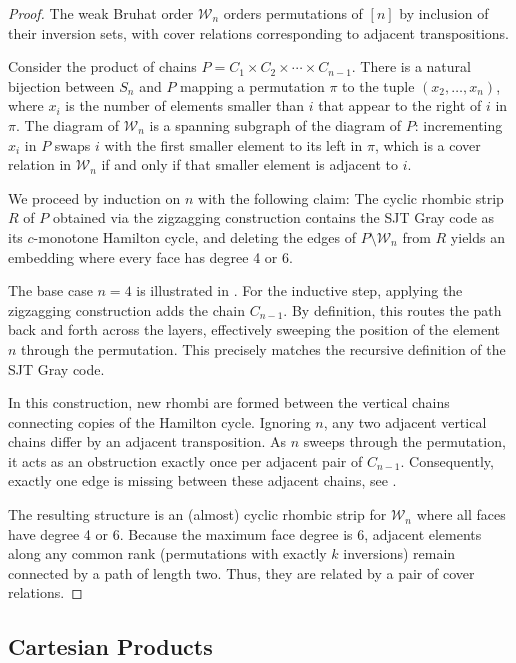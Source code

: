 \documentclass[fontsize=11pt,a4paper,DIV=12]{scrartcl}
\begin{document}
\weakBruhat*
\begin{proof}
	The weak Bruhat order $\mathcal{W}_n$ orders permutations of $[n]$ by inclusion of their inversion sets, with cover relations corresponding to adjacent transpositions.

	Consider the product of chains $P = C_1 \times C_2 \times \cdots \times C_{n-1}$. There is a natural bijection between $S_n$ and $P$ mapping a permutation $\pi$ to the tuple $(x_2, \ldots, x_n)$, where $x_i$ is the number of elements smaller than $i$ that appear to the right of $i$ in $\pi$. The diagram of $\mathcal{W}_n$ is a spanning subgraph of the diagram of $P$: incrementing $x_i$ in $P$ swaps $i$ with the first smaller element to its left in $\pi$, which is a cover relation in $\mathcal{W}_n$ if and only if that smaller element is adjacent to $i$.

	We proceed by induction on $n$ with the following claim: The cyclic rhombic strip $R$ of $P$ obtained via the zigzagging construction contains the SJT Gray code as its $c$-monotone Hamilton cycle, and deleting the edges of $P \setminus \mathcal{W}_n$ from $R$ yields an embedding where every face has degree 4 or 6.

	The base case $n=4$ is illustrated in . For the inductive step, applying the zigzagging construction adds the chain $C_{n-1}$. By definition, this routes the path back and forth across the layers, effectively sweeping the position of the element $n$ through the permutation. This precisely matches the recursive definition of the SJT Gray code.

	In this construction, new rhombi are formed between the vertical chains connecting copies of the Hamilton cycle. Ignoring $n$, any two adjacent vertical chains differ by an adjacent transposition. As $n$ sweeps through the permutation, it acts as an obstruction exactly once per adjacent pair of $C_{n-1}$. Consequently, exactly one edge is missing between these adjacent chains, see .

	The resulting structure is an (almost) cyclic rhombic strip for $\mathcal{W}_n$ where all faces have degree 4 or 6. Because the maximum face degree is 6, adjacent elements along any common rank (permutations with exactly $k$ inversions) remain connected by a path of length two. Thus, they are related by a pair of cover relations.
\end{proof}

\subsection{Cartesian Products}
\end{document}
